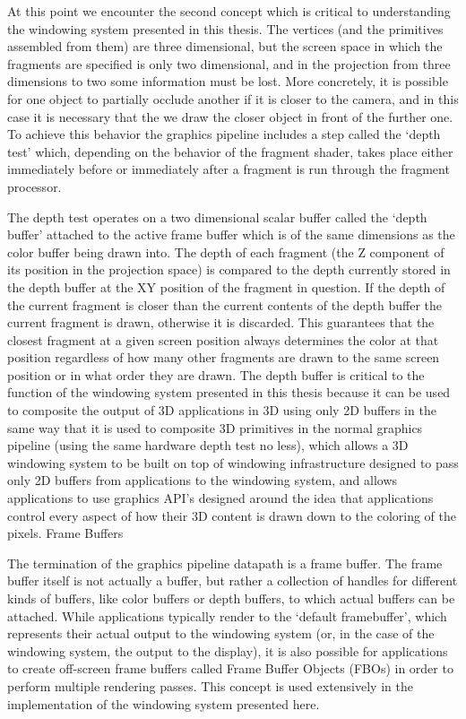 At this point we encounter the second concept which is critical to understanding the windowing system presented in this thesis. The vertices (and the primitives assembled from them) are three dimensional, but the screen space in which the fragments are specified is only two dimensional, and in the projection from three dimensions to two some information must be lost. More concretely, it is possible for one object to partially occlude another if it is closer to the camera, and in this case it is necessary that the we draw the closer object in front of the further one. To achieve this behavior the graphics pipeline includes a step called the ‘depth test’ which, depending on the behavior of the fragment shader, takes place either immediately before or immediately after a fragment is run through the fragment processor.

The depth test operates on a two dimensional scalar buffer called the ‘depth buffer’ attached to the active frame buffer which is of the same dimensions as the color buffer being drawn into. The depth of each fragment (the Z component of its position in the projection space) is compared to the depth currently stored in the depth buffer at the XY position of the fragment in question. If the depth of the current fragment is closer than the current contents of the depth buffer the current fragment is drawn, otherwise it is discarded. This guarantees that the closest fragment at a given screen position always determines the color at that position regardless of how many other fragments are drawn to the same screen position or in what order they are drawn. 
The depth buffer is critical to the function of the windowing system presented in this thesis because it can be used to composite the output of 3D applications in 3D using only 2D buffers in the same way that it is used to composite 3D primitives in the normal graphics pipeline (using the same hardware depth test no less), which allows a 3D windowing system to be built on top of windowing infrastructure designed to pass only 2D buffers from applications to the windowing system, and allows applications to use graphics API’s designed around the idea that applications control every aspect of how their 3D content is drawn down to the coloring of the pixels.
Frame Buffers

The termination of the graphics pipeline datapath is a frame buffer. The frame buffer itself is not actually a buffer, but rather a collection of handles for different kinds of buffers, like color buffers or depth buffers, to which actual buffers can be attached. While applications typically render to the ‘default framebuffer’, which represents their actual output to the windowing system (or, in the case of the windowing system, the output to the display), it is also possible for applications to create off-screen frame buffers called Frame Buffer Objects (FBOs) in order to perform multiple rendering passes. This concept is used extensively in the implementation of the windowing system presented here. 

